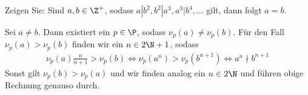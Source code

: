 
\begin{exercise}

Zeigen Sie: Sind $a, b \in \Z^+$, sodass $a|b^2, b^2 | a^3, a^3 | b^4, \dots$ gilt,
dann folgt $a = b$.

\end{exercise}


\begin{solution}

Sei $a \neq b$. Dann existiert ein $p \in \P$, sodass $\nu_p(a) \neq \nu_p(b)$.
Für den Fall $\nu_p(a) > \nu_p(b)$ finden wir ein $n \in 2\N + 1$, sodass
\begin{align*}
  \nu_p(a) \frac{n}{n+1} > \nu_p(b)
  \iff \nu_p(a^n) > \nu_p(b^{n+1})
  \iff a^n \nmid b^{n+1}
\end{align*}
Sonst gilt $\nu_p(b) > \nu_p(a)$ und wir finden analog ein $n \in 2\N$
und führen obige Rechnung genauso durch.
\end{solution}

